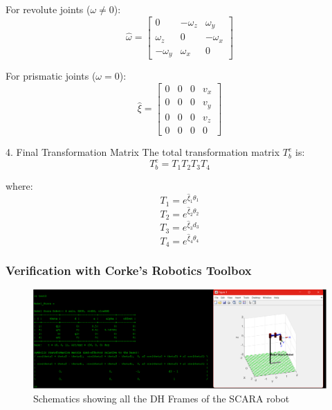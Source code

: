 \documentclass[12pt]{report}
\begin{document}
For revolute joints (\(\omega \neq 0\)):
\begin{equation}
	\hat{\omega} =
	\begin{bmatrix}
		0 & -\omega_z & \omega_y \\
		\omega_z & 0 & -\omega_x \\
		-\omega_y & \omega_x & 0
	\end{bmatrix}
\end{equation}

For prismatic joints (\(\omega = 0\)):
\begin{equation}
	\hat{\xi} =
	\begin{bmatrix}
		0 & 0 & 0 & v_x \\
		0 & 0 & 0 & v_y \\
		0 & 0 & 0 & v_z \\
		0 & 0 & 0 & 0
	\end{bmatrix}
\end{equation}


4. Final Transformation Matrix
The total transformation matrix \(T_b^e\) is:
\begin{equation}
	T_b^e = T_1 T_2 T_3 T_4
\end{equation}

where:
\begin{equation}
	T_1 = e^{\hat{\xi}_1 \theta_1}
\end{equation}
\begin{equation}
	T_2 = e^{\hat{\xi}_2 \theta_2}
\end{equation}
\begin{equation}
	T_3 = e^{\hat{\xi}_3 d_3}
\end{equation}
\begin{equation}
	T_4 = e^{\hat{\xi}_4 \theta_4}
\end{equation}




\subsubsection{Verification with Corke's Robotics Toolbox}
\begin{figure}[H]
	\centering
	\includegraphics[scale=0.47]{run1} %
	\caption{Schematics showing all the DH Frames of the SCARA robot}
	\label{fig:run1} %
\end{figure}
\end{document}
